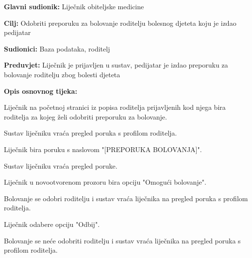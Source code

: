 					
					
					\noindent {}
					\begin{packed_item}
						
						\item \textbf{Glavni sudionik: }Liječnik obiteljske medicine
						\item  \textbf{Cilj:} Odobriti preporuku za bolovanje roditelju bolesnog djeteta koju je izdao pedijatar
						\item  \textbf{Sudionici:} Baza podataka, roditelj
						\item  \textbf{Preduvjet:} Liječnik je prijavljen u sustav, pedijatar je izdao preporuku za bolovanje roditelju zbog bolesti djeteta
						\item  \textbf{Opis osnovnog tijeka:}
						
						\item[] \begin{packed_enum}
							
							\item Liječnik na početnoj stranici iz popisa roditelja prijavljenih kod njega bira roditelja za kojeg želi odobriti preporuku za bolovanje.
							\item Sustav liječniku vraća pregled poruka s profilom roditelja.
							\item Liječnik bira poruku s naslovom "[PREPORUKA BOLOVANJA]".
							\item Sustav liječniku vraća pregled poruke.
							\item Liječnik u novootvorenom prozoru bira opciju "Omogući bolovanje".
							\item Bolovanje se odobri roditelju i sustav vraća liječnika na pregled poruka s profilom roditelja.
						\end{packed_enum}
						\item[] \begin{packed_item}
							
							\item[5.a] Liječnik odabere opciju "Odbij".
							\item[] \begin{packed_enum}
								
								\item Bolovanje se neće odobriti roditelju i sustav vraća liječnika na pregled poruka s profilom roditelja.
							\end{packed_enum}
							
							
						\end{packed_item}
						
						
						
					\end{packed_item}
					
